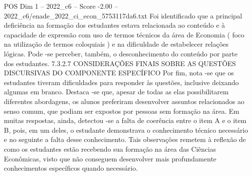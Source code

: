 \begin{textsample}{POS Dim 1 – 2022\_c6 – Score -2.00 – 2022\_c6/enade\_2022\_ci\_econ\_5753117da6.txt}
Foi identificado que a principal deficiência na formação dos estudantes estava relacionada ao conteúdo e à capacidade de expressão com uso de termos técnicos da área de Economia ( foco na utilização de termos coloquiais ) e na dificuldade de estabelecer relações lógicas.
Pode -se perceber, também, o desconhecimento do conteúdo por parte dos estudantes. 7.3.2.7 CONSIDERAÇÕES FINAIS SOBRE AS QUESTÕES DISCURSIVAS DO COMPONENTE ESPECÍFICO Por fim, nota -se que os estudantes tiveram dificuldades para responder às questões, inclusive deixando algumas em branco.
Destaca -se que, apesar de todas as elas possibilitarem diferentes abordagens, os alunos preferiram desenvolver assuntos relacionados ao senso comum, que podiam ser expostos por pessoas sem formação na área.
Em muitas respostas, ainda, detectou -se a falta de coerência entre o item A e o item B, pois, em um deles, o estudante demonstrava o conhecimento técnico necessário e no seguinte a falta desse conhecimento.
Tais observações remetem à reflexão de como os estudantes estão recebendo sua formação na área das Ciências Econômicas, visto que não conseguem desenvolver mais profundamente conhecimentos específicos quando necessário.

\end{textsample}

